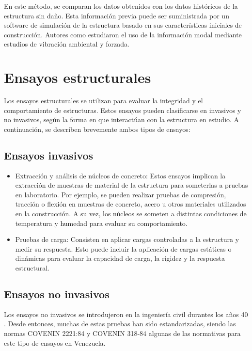     En este método, se comparan los datos obtenidos con los datos históricos de la estructura sin daño. Esta información previa puede ser suministrada por un software de simulación de la estructura basado en sus características iniciales de construcción. Autores como \cite{fritzen2005vibration} estudiaron el uso de la información modal mediante estudios de vibración ambiental y forzada.

\section{Ensayos estructurales}

Los ensayos estructurales se utilizan para evaluar la integridad y el comportamiento de estructuras. Estos ensayos pueden clasificarse en invasivos y no invasivos, según la forma en que interactúan con la estructura en estudio. A continuación, se describen brevemente ambos tipos de ensayos:

\subsection{Ensayos invasivos}

\begin{itemize}
    \item{Extracción y análisis de núcleos de concreto:} Estos ensayos implican la extracción de muestras de material de la estructura para someterlas a pruebas en laboratorio. Por ejemplo, se pueden realizar pruebas de compresión, tracción o flexión en muestras de concreto, acero u otros materiales utilizados en la construcción. A su vez, los núcleos se someten a distintas condiciones de temperatura y humedad para evaluar su comportamiento.
    \item{Pruebas de carga:} Consisten en aplicar cargas controladas a la estructura y medir su respuesta. Esto puede incluir la aplicación de cargas estáticas o dinámicas para evaluar la capacidad de carga, la rigidez y la respuesta estructural.

\end{itemize}
   
\subsection{Ensayos no invasivos} 

Los ensayos no invasivos se introdujeron en la ingeniería civil durantes los años 40 \citep{mohamed2014}. Desde entonces, muchas de estas pruebas han sido estandarizadas, siendo las normas COVENIN 2221:84 y COVENIN 318-84 algunas de las normativas para este tipo de ensayos en Venezuela. 

